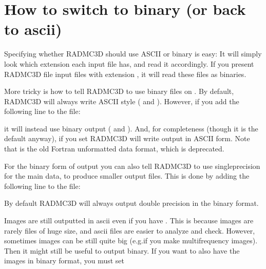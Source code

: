 \documentclass[letterpaper,10pt,english]{sphinxmanual}
\begin{document}
\section{How to switch to binary (or back to ascii)}
\label{\detokenize{binaryio:how-to-switch-to-binary-or-back-to-ascii}}\label{\detokenize{binaryio:sec-switch-to-binary}}
Specifying whether RADMC\sphinxhyphen{}3D should use ASCII or binary  is easy: It will
simply look which extension each input file has, and read it accordingly. If you
present RADMC\sphinxhyphen{}3D file input files with extension , it will read these
files as binaries.

More tricky is how to tell RADMC\sphinxhyphen{}3D to use binary files on . By default,
RADMC\sphinxhyphen{}3D will always write ASCII style ( and ). However, if
you add the following line to the  file:

\begin{sphinxVerbatim}[commandchars=\\\{\}]
  
\end{sphinxVerbatim}

it will instead use binary output ( and ). And, for
completeness (though it is the default anyway), if you set 
RADMC\sphinxhyphen{}3D will write output in ASCII form. Note that  is
the old Fortran unformatted data format, which is deprecated.

For the binary form of output you can also tell RADMC\sphinxhyphen{}3D to use single\sphinxhyphen{}precision
for the main data, to produce smaller output files. This is done by adding the
following line to the  file:

\begin{sphinxVerbatim}[commandchars=\\\{\}]
  
\end{sphinxVerbatim}

By default RADMC\sphinxhyphen{}3D will always output double precision in the binary format.

 Images are still outputted in ascii even if you have . This is because images are rarely files of huge size, and ascii files are
easier to analyze and check. However, sometimes images can be still quite big
(e.g.if you make multi\sphinxhyphen{}frequency images). Then it might still be useful to
output binary. If you want to also have the images in binary format, you must
set
\end{document}
